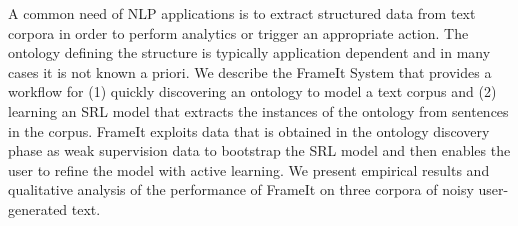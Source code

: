 A common need of NLP applications is to extract structured data from text corpora in order to perform analytics or trigger an appropriate action. The ontology defining the structure is typically application dependent and in many cases it is not known a priori. We describe the FrameIt System that provides a workflow for  (1) quickly discovering an ontology to model a text corpus and  (2) learning an SRL model that extracts the instances of the ontology from sentences in the corpus. FrameIt exploits data that is obtained in the ontology discovery phase as weak supervision data to bootstrap the SRL model and then enables the user to refine the model with active learning. We present empirical results and qualitative analysis of the performance of FrameIt on three corpora of noisy user-generated text.
